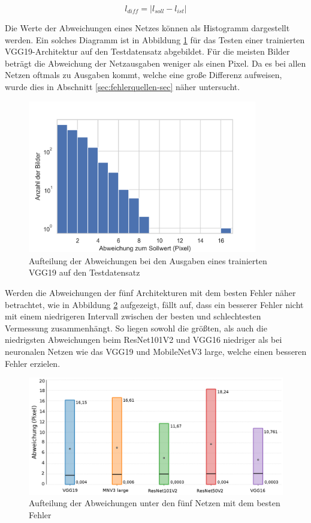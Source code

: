 \begin{equation}\label{eq:abweichung-netz}
l_{diff} = | l_{soll}-l_{ist} |
\end{equation}

\mypar Die Werte der Abweichungen eines Netzes können als Histogramm dargestellt werden. Ein solches Diagramm ist in Abbildung \ref{fig:vgg-histogramm} für das Testen einer trainierten VGG19-Architektur auf den Testdatensatz abgebildet. Für die meisten Bilder beträgt die Abweichung der Netzausgaben weniger als einen Pixel. Da es bei allen Netzen oftmals zu Ausgaben kommt, welche eine große Differenz aufweisen, wurde dies in Abschnitt \ref{sec:fehlerquellen-sec} näher untersucht.

\begin{figure}[h!]
\centering
\includegraphics[width=10cm]{98_images/vgg_histogramm.png}
\caption{Aufteilung der Abweichungen bei den Ausgaben eines trainierten VGG19 auf den Testdatensatz}
\label{fig:vgg-histogramm}
\end{figure}

\mypar Werden die Abweichungen der fünf Architekturen mit dem besten Fehler näher betrachtet, wie in Abbildung \ref{fig:best-worst-preds} aufgezeigt, fällt auf, dass ein besserer Fehler nicht mit einem niedrigeren Intervall zwischen der besten und schlechtesten Vermessung zusammenhängt. So liegen sowohl die größten, als auch die niedrigsten Abweichungen beim ResNet101V2 und VGG16 niedriger als bei neuronalen Netzen wie das VGG19 und MobileNetV3 large, welche einen besseren Fehler erzielen. 

\begin{figure}[h!]
\centering
\includegraphics[width=14.5cm]{98_images/best_worst_preds.png}
\caption{Aufteilung der Abweichungen unter den fünf Netzen mit dem besten Fehler}
\label{fig:best-worst-preds}
\end{figure}


